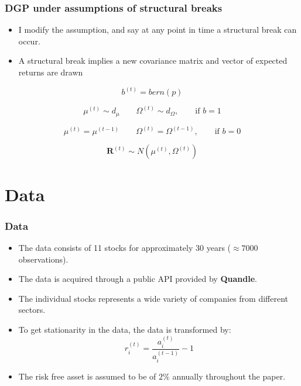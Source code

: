\documentclass{beamer}
\newcommand{\RR}{\mathbf{R}}
\begin{document}
\begin{frame}
\frametitle{DGP under assumptions of structural breaks}

\begin{itemize}
\item I modify the assumption, and say at any point in time a structural break can occur.
\item A structural break implies a new covariance matrix and vector of expected returns are drawn
\end{itemize}

\begin{equation}\label{eq:structuralbreak}
    b^{(t)} = bern(p)
\end{equation}

\begin{equation}
    \mu^{(t)} \sim d_{\mu} \qquad \Omega^{(t)} \sim d_{\Omega}, \qquad \text{if $b=1$}
\end{equation}

\begin{equation}
    \mu^{(t)} = \mu^{(t-1)} \qquad \Omega^{(t)} = \Omega^{(t-1)}, \qquad \text{if $b=0$}
\end{equation}

\begin{equation}
    \RR^{(t)} \sim N(\mu^{(t)}, \Omega^{(t)})
\end{equation}

\end{frame}

\section{Data}

\begin{frame}
\frametitle{Data}

\begin{itemize}
    \item The data consists of 11 stocks for approximately 30 years ($\approx 7000$ observations).
    \item The data is acquired through a public API provided by \textbf{Quandle}.
    \item The individual stocks represents a wide variety of companies from different sectors.
    \item To get stationarity in the data, the data is transformed by:
    \begin{equation}
            r_{i}^{(t)} = \frac{a_{i}^{(t)}}{a_i^{(t-1) }}   - 1
    \end{equation}
    \item The risk free asset is assumed to be of $2 \%$ annually throughout the paper.
\end{itemize}

\end{frame}
\end{document}
